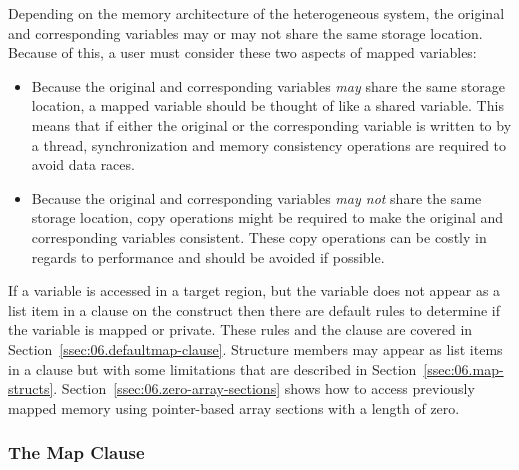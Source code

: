 Depending on the memory architecture of the heterogeneous system, the original
and corresponding variables may or may not share the same storage location.
Because of this, a user must consider these two aspects of mapped
variables: \begin{itemize}

    \item Because the original and corresponding variables \emph{may} share the
    same storage location, a mapped variable should be thought of like a shared
    variable.  This means that if either the original or the corresponding
    variable is written to by a thread, synchronization and memory consistency
    operations are required to avoid data races.

    \item Because the original and corresponding variables \emph{may not} share
    the same storage location, copy operations might be required to make the
    original and corresponding variables consistent.  These copy operations can
    be costly in regards to performance and should be
    avoided if possible.

\end{itemize}

If a variable is accessed in a target
region, but the variable does not appear as a list item in a  clause
on the construct then there are default rules to determine if the variable is
mapped or private.  These rules and the  clause are covered in
Section~\ref{ssec:06.defaultmap-clause}.  Structure members may appear as list
items in a  clause but with some limitations that are described in
Section~\ref{ssec:06.map-structs}.
Section~\ref{ssec:06.zero-array-sections} shows how to access
previously mapped memory using pointer-based array sections with a length of
zero.



\subsubsection{The Map Clause}
\label{sec:06.map-clause}

